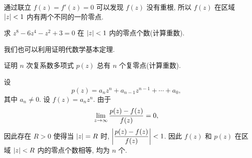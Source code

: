 通过联立 $f(z)=f'(z)=0$ 可以发现 $f(z)$ 没有重根, 所以 $f(z)$ 在区域 $\lvert z\rvert<1$ 内有两个不同的一阶零点.

\begin{exercise}
  求 $z^8-6z^4-z^2+3=0$ 在 $\lvert z\rvert<1$ 内的零点个数(计算重数).
\end{exercise}

我们也可以利用\thmRouche 证明代数学基本定理.
\begin{example}[代数学基本定理]
	证明 $n$ 次复系数多项式 $p(z)$ 总有 $n$ 个复零点(计算重数).
\end{example}

\begin{solution}
  设
  \[
    p(z)=a_nz^n+a_{n-1}z^{n-1}+\cdots+a_0,
  \]
  其中 $a_n\neq 0$.
  设 $f(z)=a_n z^n$.
  由于
  \[
    \lim_{z\rightarrow\infty}\frac{p(z)-f(z)}{f(z)}=0,
  \]
  因此存在 $R>0$ 使得当 $\lvert z\rvert=R$ 时, $\biggl\vert\dfrac{p(z)-f(z)}{f(z)}\biggr\vert<1$.
  因此 $f(z)$ 和 $p(z)$ 在区域 $\lvert z\rvert<R$ 内的零点个数相等, 均为 $n$ 个.
\end{solution}


\newpage
{}

